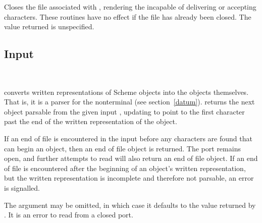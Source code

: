 \begin{entry}{%
}

Closes the file associated with , rendering the 
incapable of delivering or accepting characters.  
These routines have no effect if the file has already been closed.
The value returned is unspecified.



\end{entry}


\subsection{Input}
\label{inputsection}

\noindent \hbox{ }  %
\vspace{-5ex}

\begin{entry}{%
}

 converts written representations of Scheme objects into the
objects themselves.  That is, it is a parser for the nonterminal
 (see section~\ref{datum}).   returns the next
object parsable from the given input , updating  to
point to the first character past the end of the written representation
of the object.

\vest If an end of file is encountered in the input before any
characters are found that can begin an object, then an end of file
object is returned.  \todo{} The port remains open, and further attempts
to read will also return an end of file object.  If an end of file is
encountered after the beginning of an object's written representation,
but the written representation is incomplete and therefore not parsable,
an error is signalled.

The  argument may be omitted, in which case it defaults to the
value returned by .  It is an error to read from
a closed port.
\end{entry}

